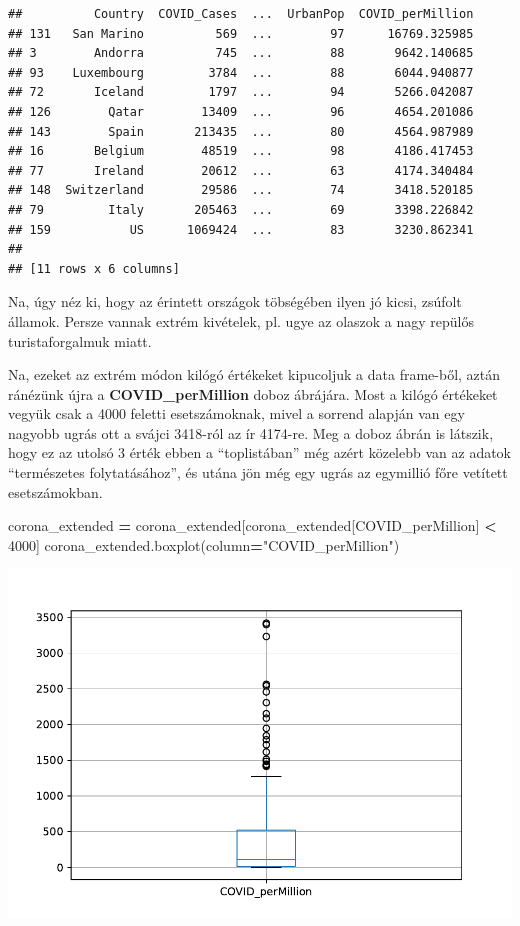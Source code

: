 \documentclass[
]{book}
\newenvironment{Shaded}{\begin{snugshade}}{\end{snugshade}}
\newcommand{\DecValTok}[1]{\textcolor[rgb]{0.00,0.00,0.81}{#1}}
\newcommand{\NormalTok}[1]{#1}
\newcommand{\OperatorTok}[1]{\textcolor[rgb]{0.81,0.36,0.00}{\textbf{#1}}}
\newcommand{\StringTok}[1]{\textcolor[rgb]{0.31,0.60,0.02}{#1}}
\begin{document}
\begin{verbatim}
##          Country  COVID_Cases  ...  UrbanPop  COVID_perMillion
## 131   San Marino          569  ...        97      16769.325985
## 3        Andorra          745  ...        88       9642.140685
## 93    Luxembourg         3784  ...        88       6044.940877
## 72       Iceland         1797  ...        94       5266.042087
## 126        Qatar        13409  ...        96       4654.201086
## 143        Spain       213435  ...        80       4564.987989
## 16       Belgium        48519  ...        98       4186.417453
## 77       Ireland        20612  ...        63       4174.340484
## 148  Switzerland        29586  ...        74       3418.520185
## 79         Italy       205463  ...        69       3398.226842
## 159           US      1069424  ...        83       3230.862341
## 
## [11 rows x 6 columns]
\end{verbatim}

Na, úgy néz ki, hogy az érintett országok töbségében ilyen jó kicsi, zsúfolt államok. Persze vannak extrém kivételek, pl. ugye az olaszok a nagy repülős turistaforgalmuk miatt.

Na, ezeket az extrém módon kilógó értékeket kipucoljuk a data frame-ből, aztán ránézünk újra a \textbf{COVID\_perMillion} doboz ábrájára. Most a kilógó értékeket vegyük csak a 4000 feletti esetszámoknak, mivel a sorrend alapján van egy nagyobb ugrás ott a svájci 3418-ról az ír 4174-re. Meg a doboz ábrán is látszik, hogy ez az utolsó 3 érték ebben a ``toplistában'' még azért közelebb van az adatok ``természetes folytatásához'', és utána jön még egy ugrás az egymillió főre vetített esetszámokban.

\begin{Shaded}
\begin{Highlighting}[]
\NormalTok{corona\_extended }\OperatorTok{=}\NormalTok{ corona\_extended[corona\_extended[}\StringTok{\textquotesingle{}COVID\_perMillion\textquotesingle{}}\NormalTok{] }\OperatorTok{\textless{}} \DecValTok{4000}\NormalTok{]}
\NormalTok{corona\_extended.boxplot(column}\OperatorTok{=}\StringTok{"COVID\_perMillion"}\NormalTok{)}
\end{Highlighting}
\end{Shaded}

\includegraphics{_main_files/figure-latex/unnamed-chunk-118-11.pdf}
\end{document}
